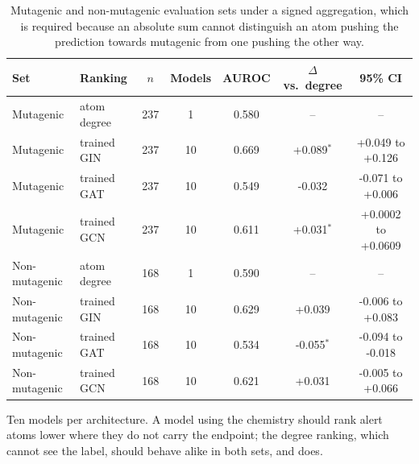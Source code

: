 \begin{table}[htbp]
\centering
\caption{Mutagenic and non-mutagenic evaluation sets under a signed aggregation, which is required because an absolute sum cannot distinguish an atom pushing the prediction towards mutagenic from one pushing the other way.}
\label{tab:specificity}
\footnotesize
\setlength{\tabcolsep}{4pt}
\begin{tabular}{llccccc}
\toprule
Set & Ranking & $n$ & Models & AUROC & $\Delta$ vs.\ degree & 95\% CI \\
\midrule
Mutagenic & atom degree & 237 & 1 & 0.580 & -- & -- \\
Mutagenic & trained GIN & 237 & 10 & 0.669 & +0.089$^{*}$ & +0.049 to +0.126 \\
Mutagenic & trained GAT & 237 & 10 & 0.549 & -0.032 & -0.071 to +0.006 \\
Mutagenic & trained GCN & 237 & 10 & 0.611 & +0.031$^{*}$ & +0.0002 to +0.0609 \\
Non-mutagenic & atom degree & 168 & 1 & 0.590 & -- & -- \\
Non-mutagenic & trained GIN & 168 & 10 & 0.629 & +0.039 & -0.006 to +0.083 \\
Non-mutagenic & trained GAT & 168 & 10 & 0.534 & -0.055$^{*}$ & -0.094 to -0.018 \\
Non-mutagenic & trained GCN & 168 & 10 & 0.621 & +0.031 & -0.005 to +0.066 \\
\bottomrule
\end{tabular}
\begin{flushleft}\footnotesize Ten models per architecture. A model using the chemistry should rank alert atoms lower where they do not carry the endpoint; the degree ranking, which cannot see the label, should behave alike in both sets, and does.\end{flushleft}
\end{table}
